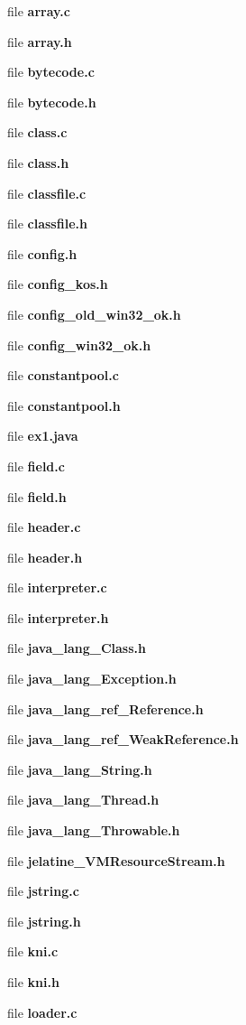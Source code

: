 \begin{DoxyCompactItemize}
\item 
file {\bf array.c}
\item 
file {\bf array.h}
\item 
file {\bf bytecode.c}
\item 
file {\bf bytecode.h}
\item 
file {\bf class.c}
\item 
file {\bf class.h}
\item 
file {\bf classfile.c}
\item 
file {\bf classfile.h}
\item 
file {\bfseries config.h}
\item 
file {\bfseries config\_\-kos.h}
\item 
file {\bfseries config\_\-old\_\-win32\_\-ok.h}
\item 
file {\bfseries config\_\-win32\_\-ok.h}
\item 
file {\bf constantpool.c}
\item 
file {\bf constantpool.h}
\item 
file {\bfseries ex1.java}
\item 
file {\bf field.c}
\item 
file {\bf field.h}
\item 
file {\bf header.c}
\item 
file {\bf header.h}
\item 
file {\bf interpreter.c}
\item 
file {\bf interpreter.h}
\item 
file {\bf java\_\-lang\_\-Class.h}
\item 
file {\bf java\_\-lang\_\-Exception.h}
\item 
file {\bf java\_\-lang\_\-ref\_\-Reference.h}
\item 
file {\bf java\_\-lang\_\-ref\_\-WeakReference.h}
\item 
file {\bf java\_\-lang\_\-String.h}
\item 
file {\bf java\_\-lang\_\-Thread.h}
\item 
file {\bf java\_\-lang\_\-Throwable.h}
\item 
file {\bf jelatine\_\-VMResourceStream.h}
\item 
file {\bf jstring.c}
\item 
file {\bf jstring.h}
\item 
file {\bf kni.c}
\item 
file {\bf kni.h}
\item 
file {\bf loader.c}

\end{DoxyCompactItemize}
